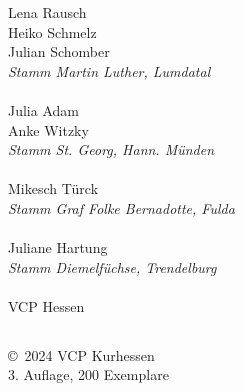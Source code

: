 \begin{centering}
\begin{multicols}{2}
Lena Rausch \\ Heiko Schmelz \\ Julian Schomber \\
\textit{Stamm Martin Luther, Lumdatal} \\ ~\\

Julia Adam \\ Anke Witzky \\
\textit{Stamm St. Georg, Hann. Münden}  \\ ~\\

Mikesch Türck \\ \textit{Stamm Graf Folke Bernadotte, Fulda} \\ ~\\

Juliane Hartung \\ \textit{Stamm Diemelfüchse, Trendelburg} \\ ~\\

VCP Hessen

\end{multicols}

\subsection*{}
\vspace{6em} \copyright~2024 VCP Kurhessen \\
3. Auflage, 200 Exemplare

\end{centering}

